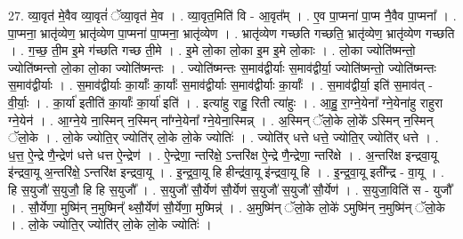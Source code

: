\documentclass[17pt]{extarticle}
\begin{document}
27. व्या॒वृत॑ मे॒वैव व्या॒वृतं॑ ॅव्या॒वृत॑ मे॒व । . व्या॒वृत॒मिति॑ वि - आ॒वृत᳚म् । . ए॒व पा॒प्मना॑ पा॒प्म नै॒वैव पा॒प्मना᳚ । . पा॒प्मना॒ भ्रातृ॑व्येण॒ भ्रातृ॑व्येण पा॒प्मना॑ पा॒प्मना॒ भ्रातृ॑व्येण । . भ्रातृ॑व्येण गच्छति गच्छति॒ भ्रातृ॑व्येण॒ भ्रातृ॑व्येण गच्छति । . ग॒च्छ॒ ती॒म इ॒मे ग॑च्छति गच्छ ती॒मे । . इ॒मे लो॒का लो॒का इ॒म इ॒मे लो॒काः । . लो॒का ज्योति॑ष्मन्तो॒ ज्योति॑ष्मन्तो लो॒का लो॒का ज्योति॑ष्मन्तः । . ज्योति॑ष्मन्तः स॒माव॑द्वीर्याः स॒माव॑द्वीर्या॒ ज्योति॑ष्मन्तो॒ ज्योति॑ष्मन्तः स॒माव॑द्वीर्याः । . स॒माव॑द्वीर्याः का॒र्याः᳚ का॒र्याः᳚ स॒माव॑द्वीर्याः स॒माव॑द्वीर्याः का॒र्याः᳚ । . स॒माव॑द्वीर्या॒ इति॑ स॒माव॑त् - वी॒र्याः॒ । . का॒र्या॑ इतीति॑ का॒र्याः᳚ का॒र्या॑ इति॑ । . इत्या॑हु राहु॒ रिती त्या॑हुः । . आ॒हु॒ रा॒ग्ने॒येना᳚ ग्ने॒येना॑हु राहुरा ग्ने॒येन॑ । . आ॒ग्ने॒ये ना॒स्मिन् न॒स्मिन् ना᳚ग्ने॒येना᳚ ग्ने॒येना॒स्मिन्न् । . अ॒स्मिन् ॅलो॒के लो॒के᳚ ऽस्मिन् न॒स्मिन् ॅलो॒के । . लो॒के ज्योति॒र् ज्योति॑र् लो॒के लो॒के ज्योतिः॑ । . ज्योति॑र् धत्ते धत्ते॒ ज्योति॒र् ज्योति॑र् धत्ते । . ध॒त्त॒ ऐ॒न्द्रे णै॒न्द्रेण॑ धत्ते धत्त ऐ॒न्द्रेण॑ । . ऐ॒न्द्रेणा॒ न्तरि॑क्षे॒ ऽन्तरि॑क्ष ऐ॒न्द्रे णै॒न्द्रेणा॒ न्तरि॑क्षे । . अ॒न्तरि॑क्ष इन्द्रवा॒यू इ॑न्द्रवा॒यू अ॒न्तरि॑क्षे॒ ऽन्तरि॑क्ष इन्द्रवा॒यू । . इ॒न्द्र॒वा॒यू हि हीन्द्र॑वा॒यू इ॑न्द्रवा॒यू हि । . इ॒न्द्र॒वा॒यू इती᳚न्द्र - वा॒यू । . हि स॒युजौ॑ स॒युजौ॒ हि हि स॒युजौ᳚ । . स॒युजौ॑ सौ॒र्येण॑ सौ॒र्येण॑ स॒युजौ॑ स॒युजौ॑ सौ॒र्येण॑ । . स॒युजा॒विति॑ स - युजौ᳚ । . सौ॒र्येणा॒ मुष्मि॑न् न॒मुष्मिन्᳚ थ्सौ॒र्येण॑ सौ॒र्येणा॒ मुष्मिन्न्॑ । . अ॒मुष्मि॑न् ॅलो॒के लो॒के॑ ऽमुष्मि॑न् न॒मुष्मि॑न् ॅलो॒के । . लो॒के ज्योति॒र् ज्योति॑र् लो॒के लो॒के ज्योतिः॑ । \newline
\end{document}
